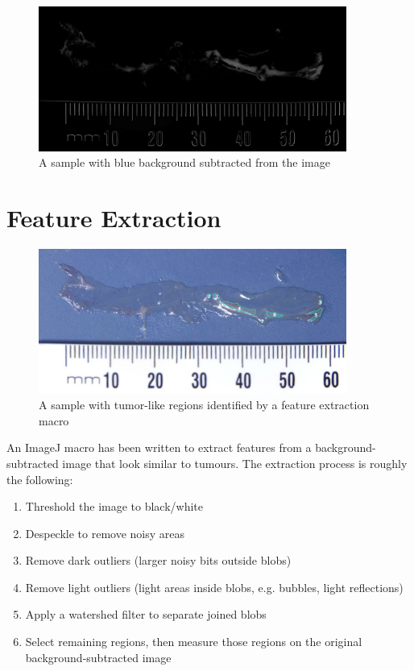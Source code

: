 \documentclass[a4paper]{scrartcl}
\begin{document}
\begin{figure}
  \centering
  \includegraphics[width=0.9\textwidth]{illustrations/small_R-B_DkrPaint.jpg}
  \caption{A sample with blue background subtracted from the image}
  \label{fig:bg-subtract}
\end{figure}

\section{Feature Extraction}

\begin{figure}
  \centering
  \includegraphics[width=0.9\textwidth]{illustrations/small_foundRegions_DkrPaint.jpg}
  \caption{A sample with tumor-like regions identified by a feature extraction macro}
  \label{fig:feature-extract}
\end{figure}

An ImageJ macro has been written to extract features from a
background-subtracted image that look similar to tumours. The
extraction process is roughly the following:

\begin{enumerate}
\item Threshold the image to black/white
\item Despeckle to remove noisy areas
\item Remove dark outliers (larger noisy bits outside blobs)
\item Remove light outliers (light areas inside blobs, e.g. bubbles,
  light reflections)
\item Apply a watershed filter to separate joined blobs
\item Select remaining regions, then measure those regions on the
  original background-subtracted image
\end{enumerate}
\end{document}
